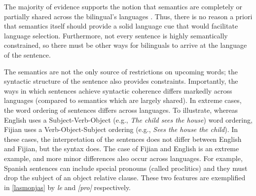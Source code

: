 The majority of evidence supports the notion that semantics are completely or partially shared across the bilingual's languages \parencite[e.g.,][]{Costa1999, Fox1996, Kroll1992, Kroll1993, Potter1984, Schwanenflugel1986, Smith1991, Snodgrass1984}. Thus, there is no reason a priori that semantics itself should provide a solid language cue that would facilitate language selection. Furthermore, not every sentence is highly semantically constrained, so there must be other ways for bilinguals to arrive at the language of the sentence.



The semantics are not the only source of restrictions on upcoming words; the syntactic structure of the sentence also provides constraints. Importantly, the ways in which sentences achieve syntactic coherence differs markedly across languages (compared to semantics which are largely shared). In extreme cases, the word ordering of sentences differs across languages. To illustrate, whereas English uses a Subject-Verb-Object (e.g., \textit{The child sees the house}) word ordering, Fijian uses a Verb-Object-Subject ordering (e.g., \textit{Sees the house the child}). In these cases, the interpretation of the sentences does not differ between English and Fijian, but the syntax does. The case of Fijian and English is an extreme example, and more minor differences also occur across languages. For example, Spanish sentences can include special pronouns (called proclitics) and they  must drop the subject of an object relative clause. These two features are exemplified in \ref{lasmonjas} by \textit{le} and \textit{[pro]} respectively. 

